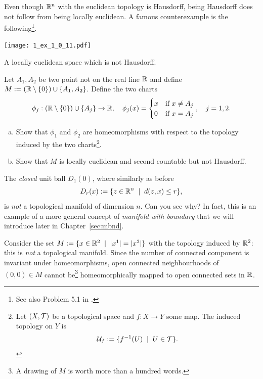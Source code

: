 \begin{exercise}
	Even though $\mathbb{R}^n$ with the euclidean topology is Hausdorff, being Hausdorff does not follow from being locally euclidean. A famous counterexample is the following\footnote{See also Problem 5.1 in \cite{book:tu}.}.
  \begin{marginfigure}
    \texttt{[image: 1\_ex\_1\_0\_11.pdf]}
    \label{fig:hausdorff-not-locally-euclidean}
    \caption{A locally euclidean space which is not Hausdorff.}
  \end{marginfigure}
  Let $A_1, A_2$ be two point not on the real line $\mathbb{R}$ and define $M:= (\mathbb{R}\setminus\{0\})\cup\{A_1,A_2\}$.
  Define the two charts
  \begin{equation}
  \phi_j:(\mathbb{R}\setminus\{0\})\cup\{A_j\} \to \mathbb{R}, \quad
  \phi_j(x) = \begin{cases} x &\mbox{if } x\neq A_j\\ 0 & \mbox{if } x = A_j \end{cases}, \quad
  j = 1,2.
  \end{equation}
  \begin{enumerate}[(a)]
    \item Show that $\phi_1$ and $\phi_2$ are homeomorphisms with respect to the topology induced by the two charts\footnote{Let $(X, \mathcal{T})$ be a topological space and $f: X\to Y$ some map. The induced topology on $Y$ is \begin{equation}\mathcal{U}_f := \{f^{-1}(U) \;\mid\; U\in\mathcal{T}\}.\end{equation}}.
    \item Show that $M$ is locally euclidean and second countable but not Hausdorff.
  \end{enumerate}
\end{exercise}

\begin{example}\label{ex:uball}
  The \emph{closed} unit ball $D_1(0)$, where similarly as before
  \begin{equation}
    D_r(x) := \{z\in\mathbb{R}^n \;\mid\; d(z,x) \leq r\},
  \end{equation}
  is \emph{not} a topological manifold of dimension $n$. Can you see why? In fact, this is an example of a more general concept of \emph{manifold with boundary} that we will introduce later in Chapter~\ref{sec:mbnd}.
\end{example}

\begin{example}
	Consider the set $M := \{ x\in\mathbb{R}^2 \;\mid\; |x^1| = |x^2| \}$ with the topology induced by $\mathbb{R}^2$:
   this is \emph{not} a topological manifold.
	Since the number of connected component is invariant under homeomorphisms, open connected neighbourhoods of $(0,0)\in M$ cannot be\footnote{A drawing of $M$ is worth more than a hundred words.} homeomorphically mapped to open connected sets in $\mathbb{R}$.
\end{example}

